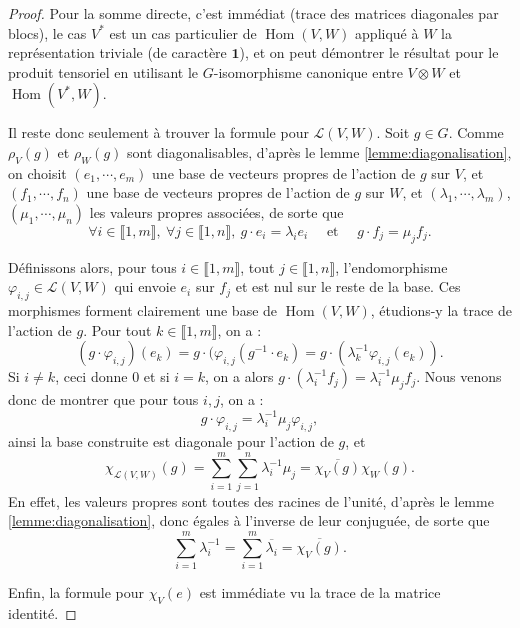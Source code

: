\documentclass[a4paper]{article}
\theoremstyle{definition} %
\theoremstyle{plain} %
\theoremstyle{remark} %
\begin{document}
\begin{proof}
	Pour la somme directe, c'est immédiat (trace des matrices diagonales par blocs), le cas $V^*$ est un cas particulier de $\operatorname{Hom}(V,W)$ appliqué à $W$ la représentation triviale (de caractère $\mathbf{1}$), et on peut démontrer le résultat pour le produit tensoriel en utilisant le $G$-isomorphisme canonique entre $V \otimes W$ et $\operatorname{Hom}(V^*,W)$.
	
	Il reste donc seulement à trouver la formule pour $\mathcal{L}(V,W)$.
	Soit $g \in G$. Comme $\rho_V(g)$ et $\rho_W(g)$ sont diagonalisables, d'après le lemme \ref{lemme:diagonalisation}, on choisit $(e_1, \cdots, e_m)$ une base de vecteurs propres de l'action de $g$ sur $V$, et $(f_1, \cdots, f_n)$ une base de vecteurs propres de l'action de $g$ sur $W$, et $(\lambda_1, \cdots, \lambda_m)$, $(\mu_1, \cdots, \mu_n)$ les valeurs propres associées, de sorte que 
	\[
	\forall i \in \llbracket 1,  m\rrbracket,\ \forall j \in \llbracket 1, n\rrbracket,\ g \cdot e_i = \lambda_i e_i \quad \text{ et }\quad g \cdot f_j = \mu_j f_j.
	\]
	
	Définissons alors, pour tous $i \in\llbracket 1,  m\rrbracket$, tout $ j \in \llbracket 1, n\rrbracket$, l'endomorphisme $\varphi_{i,j} \in \mathcal{L}(V,W)$ qui envoie $e_i$ sur $f_j$ et est nul sur le reste de la base.
	Ces morphismes forment clairement une base de $\operatorname{Hom}(V,W)$, étudions-y la trace de l'action de $g$.
	Pour tout $k \in \llbracket 1, m\rrbracket$, on a  : 
	\[
	(g \cdot \varphi_{i,j}) (e_k) = g \cdot (\varphi_{i,j}(g^{-1} \cdot e_k) = g \cdot (\lambda_k^{-1} \varphi_{i,j} (e_k)).
	\]
	Si $i \neq k$, ceci donne $0$ et si $i=k$, on a alors $g \cdot (\lambda_i^{-1} f_j) = \lambda_i^{-1} \mu_j f_j$.
	Nous venons donc de montrer que pour tous $i,j$, on a : 
	\[
	g \cdot \varphi_{i,j} = \lambda_i^{-1} \mu_j  \varphi_{i,j},
	\]
	ainsi la base construite est diagonale pour l'action de $g$, et 
	\[
	\chi_{\mathcal{L}(V,W)} (g) = \sum_{i=1}^m \sum_{j=1}^n \lambda_i^{-1} \mu_j = \overline{\chi_V(g)} \chi_W(g).
	\]
	En effet, les valeurs propres sont toutes des racines de l'unité, d'après le lemme \ref{lemme:diagonalisation}, donc égales à l'inverse de leur conjuguée, de sorte que 
	\[
	\sum_{i=1}^m \lambda_i^{-1} = \sum_{i=1}^m \overline{\lambda_i} = \overline{\chi_V(g)}.
	\]
	
	Enfin, la formule pour $\chi_V(e)$ est immédiate vu la trace de la matrice identité.
\end{proof}
\end{document}
